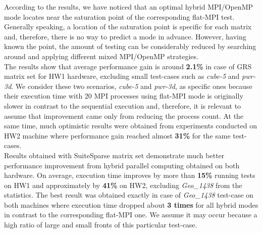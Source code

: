 

According to the results, we have noticed that an optimal hybrid MPI/OpenMP mode locates near the saturation point of the corresponding flat-MPI test. Generally speaking, a location of the saturation point is specific for each matrix and, therefore, there is no way to predict a mode in advance. However, having known the point, the amount of testing can be considerably reduced by searching around and applying different mixed MPI/OpenMP strategies.\\


The results show that average performance gain is around \textbf{2.1\%} in case of GRS matrix set for HW1 hardware, excluding small test-cases such as \textit{cube-5} and \textit{pwr-3d}. We consider these two scenarios, \textit{cube-5} and \textit{pwr-3d}, as specific ones because their execution time with 20 MPI processes using flat-MPI mode is originally slower in contrast to the sequential execution and, therefore, it is relevant to assume that improvement came only from reducing the process count. At the same time, much optimistic results were obtained from experiments conducted on HW2 machine where performance gain reached almost \textbf{31\%} for the same test-cases.\\



Results obtained with SuiteSparse matrix set demonstrate much better performance improvement from hybrid parallel computing obtained on both hardware. On average, execution time improves by more than \textbf{15\%} running tests on HW1 and approximately by \textbf{41\%} on HW2, excluding \textit{Geo\_1438} from the statistics. The best result was obtained exactly in case of \textit{Geo\_1438} test-case on both machines where execution time dropped about \textbf{3 times} for all hybrid modes in contrast to the corresponding flat-MPI one. We assume it may occur because a high ratio of large and small fronts of this particular test-case.\\


